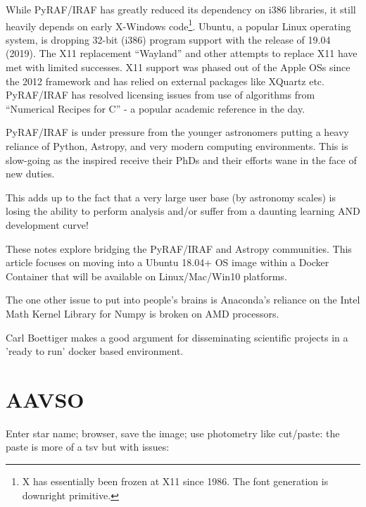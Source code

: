 \documentclass[letter,11pt,oneside]{article}
\begin{document}
While PyRAF/IRAF has greatly reduced its dependency on i386 libraries,
it still heavily depends on early X-Windows code\footnote{X has
  essentially been frozen at X11 since 1986. The font generation is
  downright primitive.}. Ubuntu, a popular Linux operating system, is
dropping 32-bit (i386) program support with the release of 19.04
(2019).  The X11 replacement ``Wayland''  and other
attempts to replace X11 have met with limited successes. X11 support was
phased out of the Apple OSs since the 2012 framework and has relied on
external packages like XQuartz etc.  PyRAF/IRAF has resolved
licensing issues from use of algorithms from ``Numerical Recipes for
C'' \cite{PresTeukVettFlan92} - a popular academic reference in the
day. 

PyRAF/IRAF is under pressure from the younger astronomers putting a
heavy reliance of Python, Astropy, and very modern computing
environments. This is slow-going as the inspired receive their PhDs
and their efforts wane in the face of new duties. 

This adds up to the fact that a very large user base (by astronomy
scales) is losing the ability to perform analysis and/or suffer from a
daunting learning AND development curve!

These notes explore bridging the PyRAF/IRAF and Astropy communities.
This article focuses on moving into a Ubuntu 18.04+ OS image within a
Docker Container that will be available on Linux/Mac/Win10 platforms.

The one other issue to put into people's brains is Anaconda's reliance
on the Intel Math Kernel Library for Numpy is broken on AMD processors.
 

Carl Boettiger \cite{DBLP:journals/corr/Boettiger14} makes a good
argument for disseminating scientific projects in a 'ready to run'
docker based environment.


\section{AAVSO}

Enter star name; browser, save the image; use photometry like
cut/paste: the paste is more of a tsv but with issues:
\end{document}
